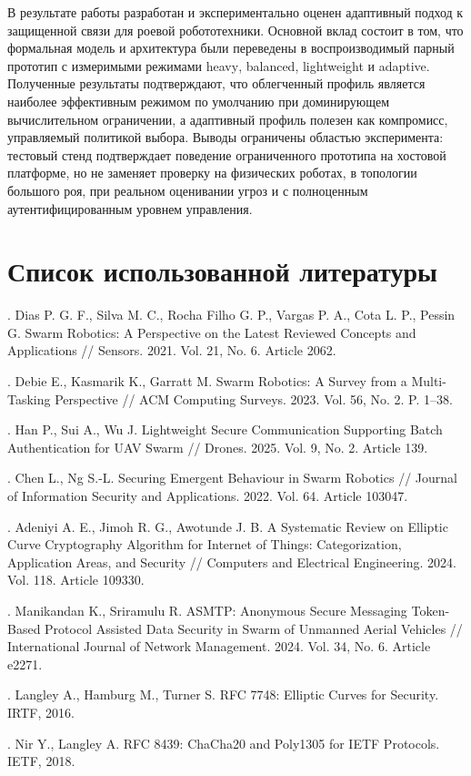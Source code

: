 \documentclass[14pt,a4paper]{extarticle}
\newcommand{\annotationsection}[1]{%
  \section*{#1}%
  \addcontentsline{toc}{section}{#1}%
}
\begin{document}
В результате работы разработан и экспериментально оценен адаптивный подход к защищенной связи для роевой робототехники. Основной вклад состоит в том, что формальная модель и архитектура были переведены в воспроизводимый парный прототип с измеримыми режимами \textenglish{heavy}, \textenglish{balanced}, \textenglish{lightweight} и \textenglish{adaptive}. Полученные результаты подтверждают, что облегченный профиль является наиболее эффективным режимом по умолчанию при доминирующем вычислительном ограничении, а адаптивный профиль полезен как компромисс, управляемый политикой выбора. Выводы ограничены областью эксперимента: тестовый стенд подтверждает поведение ограниченного прототипа на хостовой платформе, но не заменяет проверку на физических роботах, в топологии большого роя, при реальном оценивании угроз и с полноценным аутентифицированным уровнем управления.

\annotationsection{Список использованной литературы}

. Dias P. G. F., Silva M. C., Rocha Filho G. P., Vargas P. A., Cota L. P., Pessin G. Swarm Robotics: A Perspective on the Latest Reviewed Concepts and Applications // Sensors. 2021. Vol. 21, No. 6. Article 2062.

. Debie E., Kasmarik K., Garratt M. Swarm Robotics: A Survey from a Multi-Tasking Perspective // ACM Computing Surveys. 2023. Vol. 56, No. 2. P. 1--38.

. Han P., Sui A., Wu J. Lightweight Secure Communication Supporting Batch Authentication for UAV Swarm // Drones. 2025. Vol. 9, No. 2. Article 139.

. Chen L., Ng S.-L. Securing Emergent Behaviour in Swarm Robotics // Journal of Information Security and Applications. 2022. Vol. 64. Article 103047.

. Adeniyi A. E., Jimoh R. G., Awotunde J. B. A Systematic Review on Elliptic Curve Cryptography Algorithm for Internet of Things: Categorization, Application Areas, and Security // Computers and Electrical Engineering. 2024. Vol. 118. Article 109330.

. Manikandan K., Sriramulu R. ASMTP: Anonymous Secure Messaging Token-Based Protocol Assisted Data Security in Swarm of Unmanned Aerial Vehicles // International Journal of Network Management. 2024. Vol. 34, No. 6. Article e2271.

. Langley A., Hamburg M., Turner S. RFC 7748: Elliptic Curves for Security. IRTF, 2016.

. Nir Y., Langley A. RFC 8439: ChaCha20 and Poly1305 for IETF Protocols. IETF, 2018.
\end{document}
